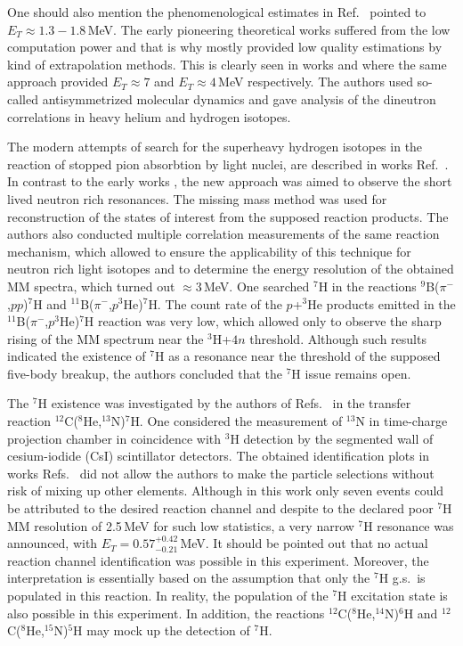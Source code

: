 One should also mention the phenomenological estimates in Ref.\ \cite{Golovkov:2004} pointed to $E_{T} \approx 1.3-1.8$\,MeV.
The early pioneering theoretical works suffered from the low computation power and that is why mostly provided low quality estimations by kind of extrapolation methods.
This is clearly seen in works \cite{Aoyama:2004} and \cite{Aoyama:2009} where the same approach provided $E_{T} \approx 7$ and $E_{T} \approx 4$\,MeV respectively.
The authors used so-called antisymmetrized molecular dynamics and gave analysis of the dineutron correlations in heavy helium and hydrogen isotopes.

The modern attempts of search for the superheavy hydrogen isotopes in the reaction of stopped pion absorbtion by light nuclei, are described in works Ref.\ \cite{Gurov:2007,Gurov:2009}.
In contrast to the early works \cite{Seth:1981,Evseev:1981}, the new approach was aimed to observe the short lived neutron rich resonances.
The missing mass method was used for reconstruction of the states of interest from the supposed reaction products.
The authors also conducted multiple correlation measurements of the same reaction mechanism, which allowed to ensure the applicability of this technique for neutron rich light isotopes and to determine the energy resolution of the obtained MM spectra, which turned out $\approx 3$\,MeV.
One searched $^7$H in the reactions $^{9}$B($\pi^-$,$p$$p$)$^7$H and $^{11}$B($\pi^-$,$p^3$He)$^7$H.
The count rate of the $p$+$^3$He products emitted in the $^{11}$B($\pi^-$,$p^3$He)$^7$H reaction was very low, which allowed only to observe the sharp rising of the MM spectrum near the $^3$H+$4n$ threshold.
Although such results indicated the existence of $^7$H as a resonance near the threshold of the supposed five-body breakup, the authors concluded that the $^{7}$H issue remains open.

The $^{7}$H existence was investigated by the authors of Refs.\ \cite{Caamano:2007,Caamano:2008} in the transfer reaction $^{12}$C($^{8}$He,$^{13}$N)$^{7}$H.
One considered the measurement of $^{13}$N in time-charge projection chamber in coincidence with $^{3}$H detection by the segmented wall of cesium-iodide (CsI) scintillator detectors.
The obtained identification plots in works Refs.\ \cite{Caamano:2007,Caamano:2008} did not allow the authors to make the particle selections without risk of mixing up other elements.
Although in this work only seven events could be attributed to the desired reaction channel and despite to the declared poor $^{7}$H MM resolution of 2.5\,MeV for such low statistics, a very narrow $^7$H resonance was announced, with $E_T= 0.57^{+0.42}_{-0.21}$\,MeV.
It should be pointed out that no actual reaction channel identification was possible in this experiment.
Moreover, the interpretation is essentially based on the assumption that only the $^{7}$H g.s.\ is populated in this reaction.
In reality, the population of the $^{7}$H excitation state is also possible in this experiment.
In addition, the reactions $^{12}$C($^{8}$He,$^{14}$N)$^{6}$H and $^{12}$C($^{8}$He,$^{15}$N)$^{5}$H may mock up the detection of $^{7}$H.


